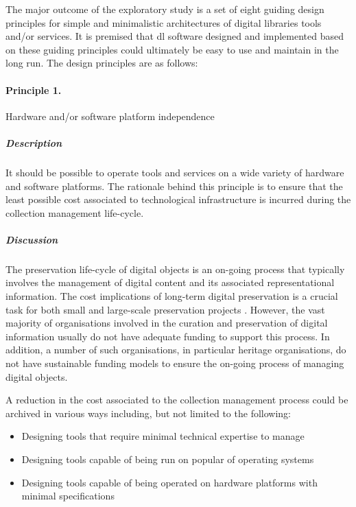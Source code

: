 The major outcome of the exploratory study is a set of eight
guiding design principles for simple and minimalistic architectures of digital
libraries tools and/or services. It is premised that \gls{dl} software
designed and implemented based on these guiding principles could ultimately
be easy to use and maintain in the long run. The design principles are as
follows:

\paragraph{Principle 1.} Hardware and/or software platform independence

\subparagraph{Description} It should be possible to operate tools and services
on
a wide variety of hardware and software platforms. The rationale behind this
principle is to ensure that the least possible cost associated to technological
infrastructure is incurred during the collection management life-cycle.


\subparagraph{Discussion} The preservation life-cycle of digital objects is an
on-going process that typically involves the management of digital content and
its associated representational information. The cost implications of long-term
digital preservation is a crucial task for both small and large-scale
preservation projects \citep{View2002}. However, the vast majority of
organisations involved in the curation and preservation of digital information
usually do not have adequate funding to support this process. In addition, a
number of such organisations, in particular heritage organisations, do not have
sustainable funding models to ensure the on-going process of managing digital
objects.

A reduction in the cost associated to the collection management process could be
archived in various ways including, but not limited to the following:

\begin{itemize}
 \item Designing tools that require minimal technical expertise to manage
 \item Designing tools capable of being run on popular of operating systems
 \item Designing tools capable of being operated on hardware platforms with
minimal specifications
\end{itemize}


